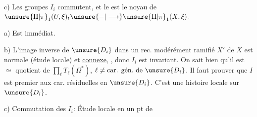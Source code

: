 c) Les groupes $I_i$ commutent, et le  est le noyau de $\unsure{\Pi|\pi}_1(U,\xi)_t\unsure{-|\longrightarrow}\unsure{\Pi|\pi}_1(X,\xi)$.

a) Est immédiat.

b) L'image inverse de $\unsure{D_i}$ dans un rec.   modérément ramifié $X'$ de $X$ est normale (étude locale) et \uline{connexe},  , donc $I_i$ est invariant. On sait bien qu'il est $\simeq$ quotient de $\prod_\ell T_\ell(\Omega^*)$, $\ell\ne\text{car. gén.}\text{ de }\unsure{D_i}$. Il faut prouver que $I$ est premier aux car. résiduelles en $\unsure{D_i}$. C'est une histoire locale sur $\unsure{D_i}$.

c) Commutation des $I_i$:  Étude locale en un pt de
